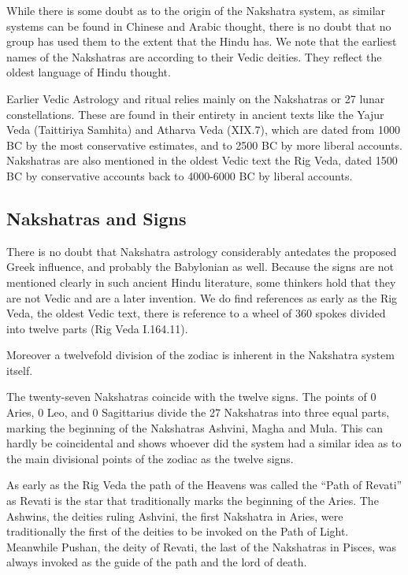 While there is some doubt as to the origin of the Nakshatra system, as similar systems can be found in Chinese and Arabic thought, there is no doubt that no group has used them to the extent that the Hindu has. We note that the earliest names of the Nakshatras are according to their Vedic deities. They reflect the oldest language of Hindu thought.

 

Earlier Vedic Astrology and ritual relies mainly on the Nakshatras or 27 lunar constellations. These are found in their entirety in ancient texts like the Yajur Veda (Taittiriya Samhita) and Atharva Veda (XIX.7), which are dated from 1000 BC by the most conservative estimates, and to 2500 BC by more liberal accounts. Nakshatras are also mentioned in the oldest Vedic text the Rig Veda, dated 1500 BC by conservative accounts back to 4000-6000 BC by liberal accounts.

 

\subsection{Nakshatras and Signs}

 

There is no doubt that Nakshatra astrology considerably antedates the proposed Greek influence, and probably the Babylonian as well. Because the signs are not mentioned clearly in such ancient Hindu literature, some thinkers hold that they are not Vedic and are a later invention. We do find references as early as the Rig Veda, the oldest Vedic text, there is reference to a wheel of 360 spokes divided into twelve parts (Rig Veda I.164.11).

 

Moreover a twelvefold division of the zodiac is inherent in the Nakshatra system itself.

 

The twenty-seven Nakshatras coincide  with the twelve signs. The points of 0 Aries, 0 Leo, and 0 Sagittarius divide the 27 Nakshatras into three equal parts, marking the beginning of the Nakshatras Ashvini, Magha and Mula. This can hardly be coincidental and shows whoever did the system had a similar idea as to the main divisional points of the zodiac as the twelve signs.

As early as the Rig Veda the path of the Heavens was called the “Path of Revati” as Revati is the star that traditionally marks the beginning of the Aries. The Ashwins, the deities ruling Ashvini, the first Nakshatra in Aries, were traditionally the first of the deities to be invoked on the Path of Light. Meanwhile Pushan, the deity of Revati, the last of the Nakshatras in Pisces, was always invoked as the guide of the path and the lord of death.

